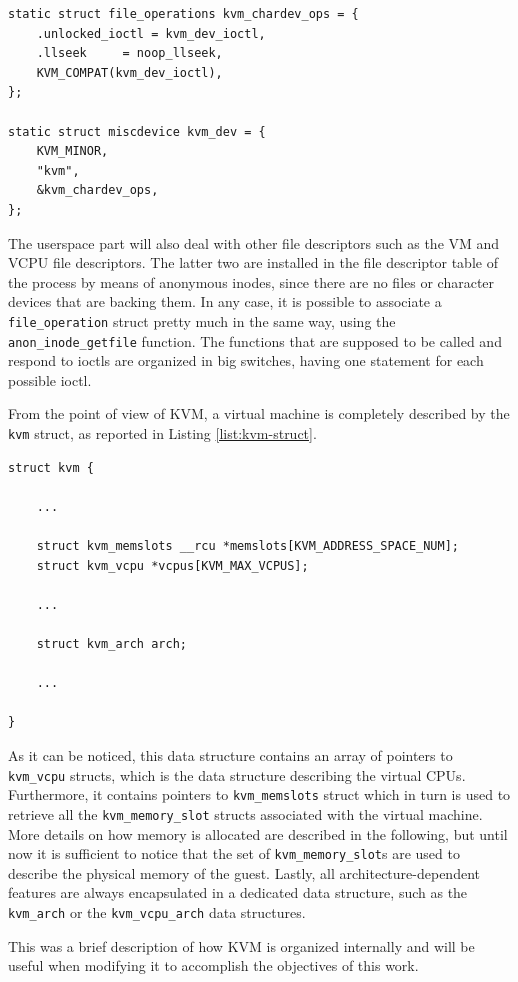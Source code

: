\begin{lstlisting}[style=c, caption={KVM character device}, label={list:kvm-char}]
static struct file_operations kvm_chardev_ops = {
	.unlocked_ioctl = kvm_dev_ioctl,
	.llseek		= noop_llseek,
	KVM_COMPAT(kvm_dev_ioctl),
};

static struct miscdevice kvm_dev = {
	KVM_MINOR,
	"kvm",
	&kvm_chardev_ops,
};
\end{lstlisting}
The userspace part will also deal with other file descriptors such as the VM and VCPU file descriptors. The latter two are installed in the file descriptor table of the process by means of anonymous inodes, since there are no files or character devices that are backing them. In any case, it is possible to associate a \texttt{file\_operation} struct pretty much in the same way, using the \texttt{anon\_inode\_getfile} function. The functions that are supposed to be called and respond to ioctls are organized in big switches, having one statement for each possible ioctl. 
\par
From the point of view of KVM, a virtual machine is completely described by the \texttt{kvm} struct, as reported in Listing \ref{list:kvm-struct}.

\begin{lstlisting}[style=c, caption={Relevant fields of struct \texttt{kvm}}, label={list:kvm-struct}]
struct kvm { 

	...

	struct kvm_memslots __rcu *memslots[KVM_ADDRESS_SPACE_NUM];
	struct kvm_vcpu *vcpus[KVM_MAX_VCPUS];
	
	...
	
	struct kvm_arch arch;
	
	...
	
}

\end{lstlisting}
As it can be noticed, this data structure contains an array of pointers to \texttt{kvm\_vcpu} structs, which is the data structure describing the virtual CPUs. Furthermore, it contains pointers to \texttt{kvm\_memslots} struct which in turn is used to retrieve all the \texttt{kvm\_memory\_slot} structs associated with the virtual machine. More details on how memory is allocated are described in the following, but until now it is sufficient to notice that the set of \texttt{kvm\_memory\_slot}s are used to describe the physical memory of the guest. Lastly, all architecture-dependent features are always encapsulated in a dedicated data structure, such as the \texttt{kvm\_arch} or the \texttt{kvm\_vcpu\_arch} data structures.
\par 
This was a brief description of how KVM is organized internally and will be useful when modifying it to accomplish the objectives of this work. 

